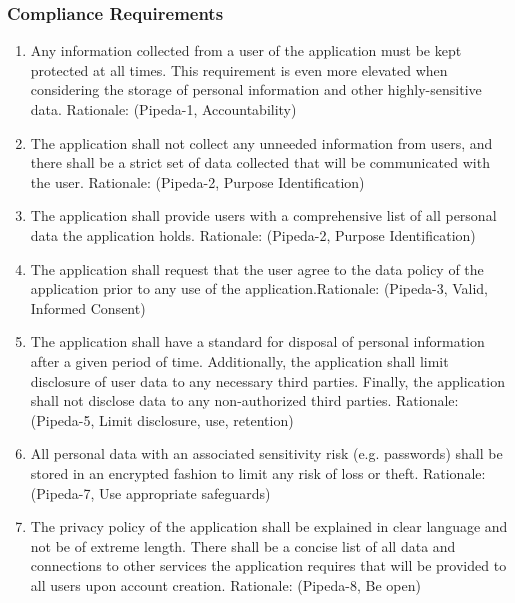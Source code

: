 \documentclass[]{article}
\begin{document}
\subsubsection{Compliance Requirements}
\label{ssub:compliance_requirements}
\begin{enumerate}[{LR-COMP}1. ]
	\item Any information collected from a user of the application must be kept protected at all times. This requirement is even more elevated when considering the storage of personal information and other highly-sensitive data. Rationale: (Pipeda-1, Accountability)
	\item The application shall not collect any unneeded information from users, and there shall be a strict set of data collected that will be communicated with the user. Rationale: (Pipeda-2, Purpose Identification)
	\item The application shall provide users with a comprehensive list of all personal data the application holds. Rationale: (Pipeda-2, Purpose Identification)
	\item The application shall request that the user agree to the data policy of the application prior to any use of the application.Rationale: (Pipeda-3, Valid, Informed Consent)
	\item The application shall have a standard for disposal of personal information after a given period of time. Additionally, the application shall limit disclosure of user data to any necessary third parties. Finally, the application shall not disclose data to any non-authorized third parties. Rationale: (Pipeda-5, Limit disclosure, use, retention)
	\item All personal data with an associated sensitivity risk (e.g. passwords) shall be stored in an encrypted fashion to limit any risk of loss or theft. Rationale: (Pipeda-7, Use appropriate safeguards)
	\item  The privacy policy of the application shall be explained in clear language and not be of extreme length. There shall be a concise list of all data and connections to other services the application requires that will be provided to all users upon account creation. Rationale: (Pipeda-8, Be open)
\end{enumerate}
\end{document}
